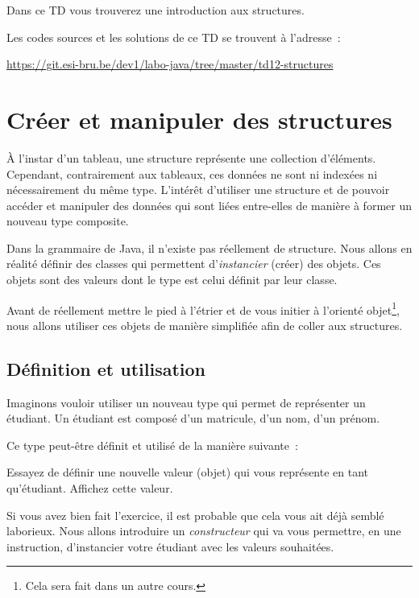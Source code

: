 \documentclass[a4paper,11pt]{article}
\date{2018 -- 2019}
\newcommand{\publicbasepath}{https://git.esi-bru.be/dev1/labo-java/tree/master/td12-structures}
\begin{document}
\entete
\titre
{}
\lastedit


	Dans ce TD vous trouverez une introduction aux structures.
	 
	Les codes sources et les solutions de ce TD se trouvent à l'adresse~: 
	
	\url{\publicbasepath}	


	\tableofcontents

	\newpage

\section{Créer et manipuler des structures}

	À l'instar d'un tableau, une structure représente une collection d'éléments. Cependant, contrairement aux tableaux, ces données ne sont ni indexées ni nécessairement du même type. L'intérêt d'utiliser une structure et de pouvoir accéder et manipuler des données qui sont liées entre-elles de manière à former un nouveau type composite.

	Dans la grammaire de Java, il n'existe pas réellement de structure. Nous allons en réalité définir des classes qui permettent d'\emph{instancier} (créer) des objets. Ces objets sont des valeurs dont le type est celui définit par leur classe.

	Avant de réellement mettre le pied à l'étrier et de vous initier à l'orienté objet\footnote{Cela sera fait dans un autre cours.}, nous allons utiliser ces objets de manière simplifiée afin de coller aux structures.


	\subsection{Définition et utilisation}

	Imaginons vouloir utiliser un nouveau type qui permet de représenter un étudiant. Un étudiant est composé d'un matricule, d'un nom, d'un prénom.

	Ce type peut-être définit et utilisé de la manière suivante~:


	Essayez de définir une nouvelle valeur (objet) qui vous représente en tant qu'étudiant. Affichez cette valeur.

	Si vous avez bien fait l'exercice, il est probable que cela vous ait déjà semblé laborieux. Nous allons introduire un \emph{constructeur} qui va vous permettre, en une instruction, d'instancier votre étudiant avec les valeurs souhaitées.
\end{document}
